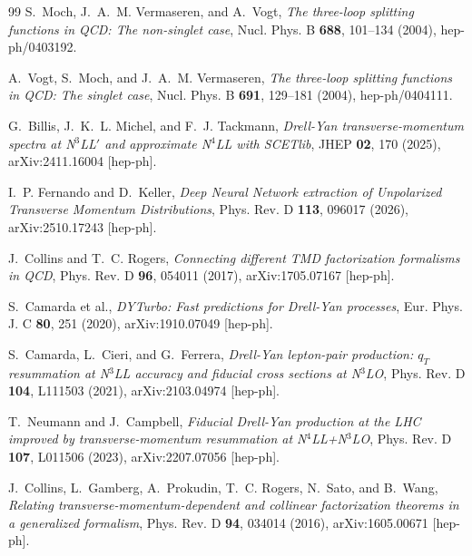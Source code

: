 \documentclass[11pt]{article}
\begin{document}
\begin{thebibliography}{99}
S.~Moch, J.~A.~M. Vermaseren, and A.~Vogt,
\textit{The three-loop splitting functions in QCD: The non-singlet case},
Nucl. Phys. B \textbf{688}, 101--134 (2004),
hep-ph/0403192.

A.~Vogt, S.~Moch, and J.~A.~M. Vermaseren,
\textit{The three-loop splitting functions in QCD: The singlet case},
Nucl. Phys. B \textbf{691}, 129--181 (2004),
hep-ph/0404111.

G.~Billis, J.~K.~L. Michel, and F.~J. Tackmann,
\textit{Drell-Yan transverse-momentum spectra at N$^3$LL$'$ and approximate N$^4$LL with SCETlib},
JHEP \textbf{02}, 170 (2025),
arXiv:2411.16004 [hep-ph].

I.~P. Fernando and D.~Keller,
\textit{Deep Neural Network extraction of Unpolarized Transverse Momentum Distributions},
Phys. Rev. D \textbf{113}, 096017 (2026),
arXiv:2510.17243 [hep-ph].

J.~Collins and T.~C. Rogers,
\textit{Connecting different TMD factorization formalisms in QCD},
Phys. Rev. D \textbf{96}, 054011 (2017),
arXiv:1705.07167 [hep-ph].

S.~Camarda et al.,
\textit{DYTurbo: Fast predictions for Drell-Yan processes},
Eur. Phys. J. C \textbf{80}, 251 (2020),
arXiv:1910.07049 [hep-ph].

S.~Camarda, L.~Cieri, and G.~Ferrera,
\textit{Drell-Yan lepton-pair production: $q_T$ resummation at N$^3$LL accuracy and fiducial cross sections at N$^3$LO},
Phys. Rev. D \textbf{104}, L111503 (2021),
arXiv:2103.04974 [hep-ph].

T.~Neumann and J.~Campbell,
\textit{Fiducial Drell-Yan production at the LHC improved by transverse-momentum resummation at N$^4$LL+N$^3$LO},
Phys. Rev. D \textbf{107}, L011506 (2023),
arXiv:2207.07056 [hep-ph].

J.~Collins, L.~Gamberg, A.~Prokudin, T.~C. Rogers, N.~Sato, and B.~Wang,
\textit{Relating transverse-momentum-dependent and collinear factorization theorems in a generalized formalism},
Phys. Rev. D \textbf{94}, 034014 (2016),
arXiv:1605.00671 [hep-ph].

\end{thebibliography}
\end{document}

